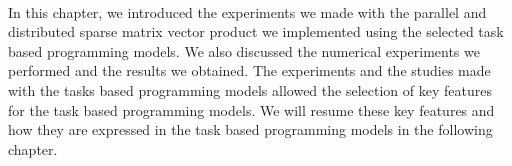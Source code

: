 \paragraph{}
In this chapter, we introduced the experiments we made with the parallel and distributed sparse matrix vector product we implemented using the selected task based programming models.
We also discussed the numerical experiments we performed and the results we obtained.
The experiments and the studies made with the tasks based programming models allowed the selection of key features for the task based programming models.
We will resume these key features and how they are expressed in the task based programming models in the following chapter.